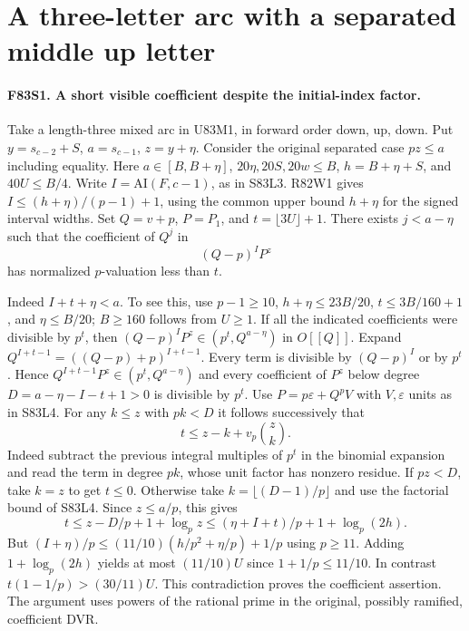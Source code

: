 \section{A three-letter arc with a separated middle up letter}

\paragraph{F83S1. A short visible coefficient despite the initial-index factor.}
Take a length-three mixed arc in U83M1, in forward order down, up,
down. Put $y=s_{c-2}+S$, $a=s_{c-1}$, $z=y+\eta$.
Consider the original separated case $pz\le a$ including equality.
Here $a\in[B,B+\eta]$, $20\eta,20S,20w\le B$, $h=B+\eta+S$,
and $40U\le B/4$. Write $I=\mathrm{AI}(F,c-1)$, as in
S83L3. R82W1 gives
$I\le(h+\eta)/(p-1)+1$, using the common upper bound $h+\eta$
for the signed interval widths. Set $Q=v+p$, $P=P_1$, and
$t=\lfloor3U\rfloor+1$. There exists $j<a-\eta$ such that the
coefficient of $Q^j$ in
\[
                          (Q-p)^I P^z
\]
has normalized $p$-valuation less than $t$.

Indeed $I+t+\eta<a$. To see this, use $p-1\ge10$,
$h+\eta\le23B/20$, $t\le3B/160+1$, and $\eta\le B/20$;
$B\ge160$ follows from $U\ge1$. If all the indicated coefficients
were divisible by $p^t$, then
$(Q-p)^IP^z\in(p^t,Q^{a-\eta})$ in $O[[Q]]$.
Expand $Q^{I+t-1}=((Q-p)+p)^{I+t-1}$. Every term is divisible
by $(Q-p)^I$ or by $p^t$. Hence
$Q^{I+t-1}P^z\in(p^t,Q^{a-\eta})$ and every coefficient of
$P^z$ below degree $D=a-\eta-I-t+1>0$ is divisible by $p^t$.
Use $P=p\varepsilon+Q^p V$ with $V,\varepsilon$ units as in
S83L4. For any $k\le z$ with $pk<D$ it follows successively that
\[
                       t\le z-k+v_p\binom zk .
\]
Indeed subtract the previous integral multiples of $p^t$ in
the binomial expansion and read the term in degree $pk$, whose
unit factor has nonzero residue. If $pz<D$, take $k=z$ to get
$t\le0$. Otherwise take $k=\lfloor(D-1)/p\rfloor$ and use the
factorial bound of S83L4. Since $z\le a/p$, this gives
\[
  t\le z-D/p+1+\log_p z
        \le (\eta+I+t)/p+1+\log_p(2h).
\]
But $(I+\eta)/p\le(11/10)(h/p^2+\eta/p)+1/p$ using $p\ge11$.
Adding $1+\log_p(2h)$ yields at most $(11/10)U$ since
$1+1/p\le11/10$. In contrast $t(1-1/p)>(30/11)U$.
This contradiction proves the coefficient assertion. The argument
uses powers of the rational prime in the original, possibly
ramified, coefficient DVR.

